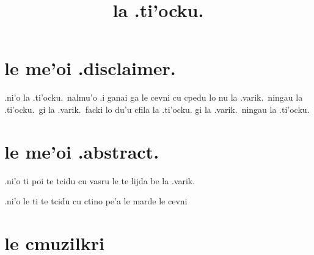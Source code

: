 \documentclass{report}
\title{la .ti'ocku.}
\begin{document}
\maketitle

\chapter{le me'oi .disclaimer.}
.ni'o la .ti'ocku.\ nalmu'o  .i ganai ga le cevni cu cpedu lo nu la .varik.\ ningau la .ti'ocku.\ gi la .varik.\ facki lo du'u cfila la .ti'ocku. gi la .varik.\ ningau la .ti'ocku.

\chapter{le me'oi .abstract.}
.ni'o ti poi te tcidu cu vasru le te lijda be la .varik.

.ni'o le ti te tcidu cu ctino pe'a le marde le cevni

\chapter{le cmuzilkri}
\end{document}
